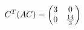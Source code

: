 \documentclass[preview]{standalone}
\begin{document}
\begin{align*}
\special{dvisvgm:raw <g id='unique000'>}C^T(AC)=\begin{pmatrix}3&0\\0&\frac{14}{3}\end{pmatrix}\special{dvisvgm:raw </g>}
\end{align*}
\end{document}
